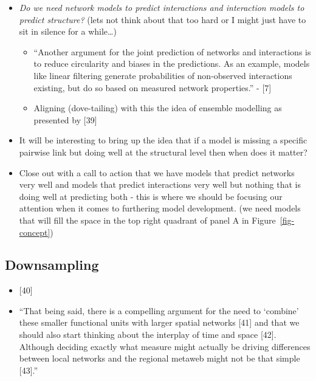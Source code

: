 \documentclass[
]{article}
\begin{document}
\begin{itemize}
\item
  \emph{Do we need network models to predict interactions and
  interaction models to predict structure?} (lets not think about that
  too hard or I might just have to sit in silence for a while\ldots)

  \begin{itemize}
  \item
    ``Another argument for the joint prediction of networks and
    interactions is to reduce circularity and biases in the predictions.
    As an example, models like linear filtering generate probabilities
    of non-observed interactions existing, but do so based on measured
    network properties.'' - {[}7{]}
  \item
    Aligning (dove-tailing) with this the idea of ensemble modelling as
    presented by {[}39{]}
  \end{itemize}
\item
  It will be interesting to bring up the idea that if a model is missing
  a specific pairwise link but doing well at the structural level then
  when does it matter?
\item
  Close out with a call to action that we have models that predict
  networks very well and models that predict interactions very well but
  nothing that is doing well at predicting both - this is where we
  should be focusing our attention when it comes to furthering model
  development. (we need models that will fill the space in the top right
  quadrant of panel A in Figure~\ref{fig-concept})
\end{itemize}

\subsection{Downsampling}\label{downsampling}

\begin{itemize}
\item
  {[}40{]}
\item
  ``That being said, there is a compelling argument for the need to
  `combine' these smaller functional units with larger spatial networks
  {[}41{]} and that we should also start thinking about the interplay of
  time and space {[}42{]}. Although deciding exactly what measure might
  actually be driving differences between local networks and the
  regional metaweb might not be that simple {[}43{]}.''
\end{itemize}
\end{document}
